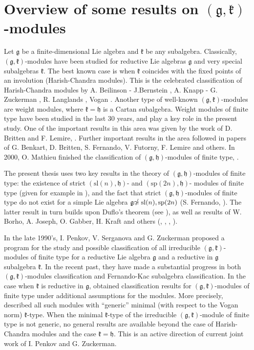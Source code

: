 \documentclass[12pt]{report}
\newcommand{\kk}{\mathfrak{k}}
\newcommand{\hh}{\mathfrak{h}}
\newcommand{\gG}{\mathfrak{g}}
\newcommand{\sL}{\mathrm{sl}}
\newcommand{\sP}{\mathrm{sp}}
\def\nsimeq{\hbox{$\simeq${\raise1.05pt\hbox{\kern -0.55em $/$}}\ }}
\begin{document}
\section{Overview of some results on $(\gG,\kk)$-modules}
Let $\gG$ be a finite-dimensional Lie algebra and $\kk$ be any subalgebra. Classically, $(\gG,\kk)$-modules have been studied for reductive Lie algebras $\gG$ and very special subalgebras $\kk$. The best known case is when $\kk$ coincides with the fixed points of an involution (Harish-Chandra modules). This is the celebrated classification of Harish-Chandra modules by  A. Beilinson - J.Bernstein \cite{BeilinsonBerstein}, A. Knapp - G. Zuckerman \cite{KnappZuckerman}, R. Langlands \cite{Langlands:IrredReps}, Vogan \cite{Vogan:SingularUnitary,Vogan:RepsRealRed}. Another type of well-known $(\gG,\kk)$-modules are weight modules, where $\kk=\hh$ is a Cartan subalgebra. Weight modules of finite type have been studied in the last 30 years, and play a key role in the present study. One of the important results in this area was given by the work of D. Britten and F. Lemire, \cite{BrittenLemire}. Further important results in the area followed in papers of G. Benkart, D. Britten, S. Fernando, V. Futorny, F. Lemire and others. In 2000, O. Mathieu finished the classification of $(\gG,\hh)$-modules of finite type, \cite{Mathieu}.

\nocite{BenkartBrittenLemire} \nocite{Futorny:thesis}

The present thesis uses two key results in the theory of $(\gG,\hh)$-modules of finite type: the existence of strict $(\sL(n),\hh)$- and  $(\sP(2n),\hh)$- modules of finite type (given for example in \cite{BrittenLemire}), and the fact that strict $(\gG,\hh)$-modules of finite type do not exist for a simple Lie algebra $\gG\nsimeq \sL(n), \sP(2n)$ (S. Fernando, \cite{Fernando1}). The latter result in turn builds upon Duflo's theorem (see \cite[Chapter 8]{Dixmier}), as well as results of  W. Borho, A. Joseph, O. Gabber, H. Kraft and others (\cite{BorhoKraft}, \cite{Gabber:IntegrabilityCharVar}, \cite{Joseph:MinDimNilpotentOrbit}, \cite{Joseph:MinimalRealizations}).

In the late 1990's, I. Penkov, V. Serganova and G. Zuckerman proposed a program for the study and possible classification of all irreducible $(\gG,\kk)$-modules of finite type for a reductive Lie algebra $\gG$ and a reductive in $\gG$ subalgebra $\kk$. In the recent past, they have made a substantial progress in both $(\gG,\kk)$-modules classification and Fernando-Kac subalgebra classification. In the case when $\kk$ is reductive in $\gG$, \cite{PZ} obtained classification results for $(\gG,\kk)$-modules of finite type under additional assumptions for the modules. More precisely, \cite{PZ} described all such modules with ``generic'' minimal (with respect to the Vogan norm) $\kk$-type. When the minimal $\kk$-type of the irreducible $(\gG,\kk)$-module of finite type is not generic, no general results are available beyond the case of Harish-Chandra modules and the case $\kk=\hh$. This is an active direction of current joint work of I. Penkov and G. Zuckerman.
\end{document}
